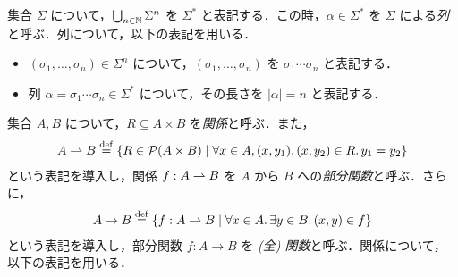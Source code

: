集合 $\Sigma$ について，$\bigcup_{n \in \mathbb{N}} \Sigma^n$ を $\Sigma^*$ と表記する．この時，$\alpha \in \Sigma^*$ を $\Sigma$ による\emph{列}と呼ぶ．列について，以下の表記を用いる．
\begin{itemize}
  \item $(\sigma_1, \ldots, \sigma_n) \in \Sigma^n$ について，$(\sigma_1, \ldots, \sigma_n)$ を $\sigma_1 \cdots \sigma_n$ と表記する．
  \item 列 $\alpha = \sigma_1 \cdots \sigma_n \in \Sigma^*$ について，その長さを $|\alpha| = n$ と表記する．
\end{itemize}

集合 $A, B$ について，$R \subseteq A \times B$ を\emph{関係}と呼ぶ．また，
\begin{align*}
  A \rightharpoonup B \mathrel{\overset{\mathrm{def}}{=}} \{R \in \mathcal{P}(A \times B) \mid \forall x \in A, (x, y_1), (x, y_2) \in R\ldotp y_1 = y_2\}
\end{align*}
という表記を導入し，関係 $f: A \rightharpoonup B$ を $A$ から $B$ への\emph{部分関数}と呼ぶ．さらに，
\begin{align*}
  A \to B \mathrel{\overset{\mathrm{def}}{=}} \{f: A \rightharpoonup B \mid \forall x \in A\ldotp\exists y \in B\ldotp (x, y) \in f\}
\end{align*}
という表記を導入し，部分関数 $f: A \to B$ を \emph{\textup{(}全\textup{)} 関数}と呼ぶ．関係について，以下の表記を用いる．
